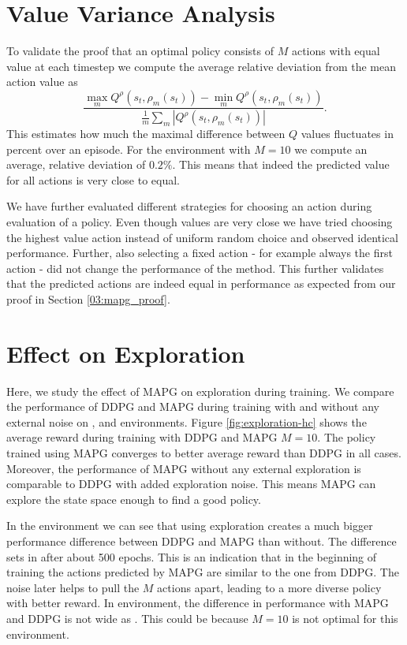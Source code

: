 \section{Value Variance Analysis}
To validate the proof that an optimal policy consists of $M$ actions with equal value at each timestep we compute the average relative deviation from the mean action value as
\begin{equation}
\frac{\max_m Q^\rho(s_{t},\rho_m(s_{t})) - \min_m Q^\rho(s_{t},\rho_m(s_{t}))}{\frac{1}{m}\sum_m{| Q^\rho(s_{t},\rho_m(s_{t})) |}}.
\end{equation}
This estimates how much the maximal difference between $Q$ values fluctuates in percent over an episode. For the  environment with $M=10$ we compute an average, relative deviation of $0.2\%$. This means that indeed the predicted value for all actions is very close to equal. 

We have further evaluated different strategies for choosing an action during evaluation of a policy. Even though values are very close we have tried choosing the highest value action instead of uniform random choice and observed identical performance. Further, also selecting a fixed action - for example always the first action - did not change the performance of the method. This further validates that the predicted actions are indeed equal in performance as expected from our proof in Section \ref{03:mapg_proof}.

\section{Effect on Exploration}

Here, we study the effect of MAPG on exploration during training. We compare the performance of DDPG and MAPG during training with and without any external noise on ,  and  environments. Figure \ref{fig:exploration-hc} shows the average reward during training with DDPG and MAPG $M=10$. The policy trained using MAPG converges to better average reward than DDPG in all cases. Moreover, the performance of MAPG without any external exploration is comparable to DDPG with added exploration noise. This means MAPG can explore the state space enough to find a good policy.

In the  environment we can see that using exploration creates a much bigger performance difference between DDPG and MAPG than without. The difference sets in after about 500 epochs. This is an indication that in the beginning of training the actions predicted by MAPG are similar to the one from DDPG. The noise later helps to pull the $M$ actions apart, leading to a more diverse policy with better reward. In  environment, the difference in performance with MAPG and DDPG is not wide as . This could be because $M=10$ is not optimal for this environment.

